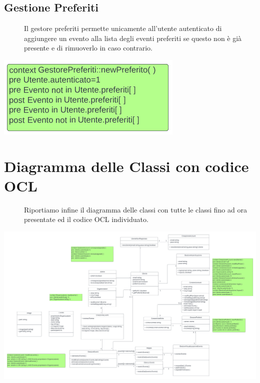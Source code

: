 \documentclass{article}
\begin{document}
\subsection{Gestione Preferiti}
\begin{description}
    \item[] Il gestore preferiti permette unicamente all'utente autenticato di aggiungere un evento alla lista degli eventi preferiti se questo non è già presente e di rimuoverlo in caso contrario.
\end{description}
\begin{center}
    \item[] \includegraphics[scale=0.4]{oclPreferiti.png}
\end{center}
\section{Diagramma delle Classi con codice OCL}
\begin{description}
    \item[] Riportiamo infine il diagramma delle classi con tutte le classi fino ad ora presentate ed il codice OCL individuato.
\end{description}
\begin{center}
    \item[] \includegraphics[scale=0.35]{oclClass.png}
\end{center}
\end{document}
